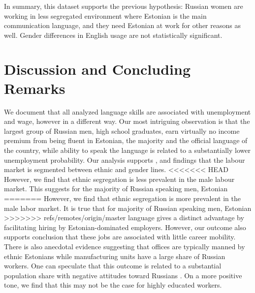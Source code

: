 \documentclass[12pt, a4paper]{article}
\begin{document}
In summary, this dataset supports the previous hypothesis: Russian women are
working in less segregated environment where Estonian is the main
communication language, and they need Estonian at work for other reasons as
well.  Gender differences in English usage are not statistically
significant.


\section{Discussion and Concluding Remarks}
\label{sec:discussion}

We document that all analyzed language skills are associated with
unemployment and wage, however in a different way. Our most
intriguing observation is that the largest group of
Russian men, high school graduates, earn virtually no income premium
from being fluent in Estonian,
the majority and the official language of the country, while ability
to speak the language is related to a substantially
lower unemployment probability.
Our analysis supports \citet{YaoandOurs2015}, and \citet{Lindemann2013} findings that
the labour market is segmented between ethnic and gender lines.
<<<<<<< HEAD
However, we find that ethnic segregation is less prevalent in the male
labour market.
This suggests for the majority of Russian speaking men, Estonian
=======
However, we find that ethnic segregation is more prevalent in the male
labor market.
It is true that for majority of Russian speaking men, Estonian
>>>>>>> refs/remotes/origin/master
language gives a distinct advantage by facilitating hiring by
Estonian-dominated employers.  However, our outcome also supports 
\citet{leppik+vihalemm2015JofBaltStud} conclusion that
these
jobs are associated with little career mobility.  There is also
anecdotal evidence suggesting that offices are
typically manned by ethnic Estonians while manufacturing units have a
large share of Russian workers.
One can speculate that this outcome is related to a substantial population share
with negative attitudes toward Russians \citep{korts2009JofBaltStud}.
On a more positive tone, we find
that this may not be the case for highly educated workers.
\end{document}
